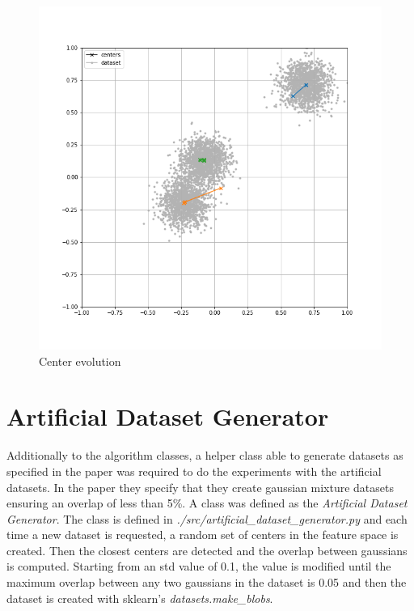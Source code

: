 \begin{figure}[!ht]
    \includegraphics[width=\linewidth]{images/summary_iteration.png}
    \caption{Center evolution}
    \label{fig:summary_iteration}
\end{figure}

\section{Artificial Dataset Generator}

Additionally to the algorithm classes, a helper class able to generate datasets as specified in the paper was required to do the experiments with the artificial datasets. In the paper they specify that they create gaussian mixture datasets ensuring an overlap of less than 5\%. A class was defined as the \textit{Artificial Dataset Generator}. The class is defined in \textit{./src/artificial\_dataset\_generator.py} and each time a new dataset is requested, a random set of centers in the feature space is created. Then the closest centers are detected and the overlap between gaussians is computed. Starting from an std value of 0.1, the value is modified until the maximum overlap between any two gaussians in the dataset is 0.05 and then the dataset is created with sklearn's \textit{datasets.make\_blobs}.
